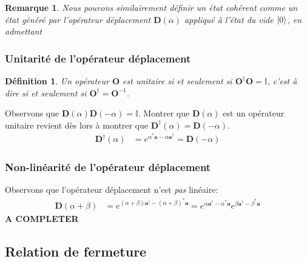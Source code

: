\documentclass[11pt,oneside,a4paper]{article}
\newtheorem{definition}[theorem]{Définition}
\newtheorem{remark}[theorem]{Remarque}
\begin{document}
\begin{remark}
  Nous pouvons similairement définir un état cohérent comme un état généré par l'opérateur déplacement $\bm{D}(\alpha)$ appliqué à l'état du vide $\ket{0}$, en admettant 
\end{remark}

\subsubsection{Unitarité de l'opérateur déplacement}

\begin{definition}
  Un opérateur $\bm{O}$ est unitaire si et seulement si $\bm{O}^\dagger\bm{O} = \mathbb{I}$, c'est à dire si et seulement si $\bm{O}^\dagger = \bm{O}^{-1}$.
\end{definition}

Observons que $\bm{D}(\alpha)\bm{D}(-\alpha) = \mathbb{I}$. Montrer que $\bm{D}(\alpha)$ est un opérateur unitaire revient dès lors à montrer que $\bm{D}^\dagger(\alpha) = \bm{D}(-\alpha)$.
\begin{align}
  \bm{D}^\dagger(\alpha) &= e^{\alpha^*\bm{a}-\alpha\bm{a}^\dagger} = \bm{D}(-\alpha) 
\end{align}

\subsubsection{Non-linéarité de l'opérateur déplacement}

Observons que l'opérateur déplacement n'est \emph{pas} linéaire:
\begin{align}
  \bm{D}(\alpha+\beta) &=  e^{\left(\alpha+\beta\right) \bm{a}^\dagger-\left(\alpha+\beta\right)^*\bm{a}}
  = e^{\alpha \bm{a}^\dagger-\alpha^*\bm{a}} e^{\beta \bm{a}^\dagger-\beta^*\bm{a}}
\end{align}
\textbf{A COMPLETER}

\subsection{Relation de fermeture}
\end{document}
